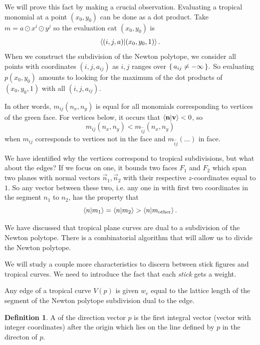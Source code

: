 \documentclass[12pt]{memoir}
\theoremstyle{definition}
\newtheorem{protodefinition}{Definition}[section]
\newenvironment{define}
   {\begin{protodefinition}}
   {\end{protodefinition}}
\begin{document}
We will prove this fact by making a crucial observation. Evaluating a tropical monomial at a point $(x_0,y_0)$ can be done as a dot product. Take $m=a\odot x^i\odot y^j$ so the evaluation cat $(x_0,y_0)$ is 
$$\braket{(i,j,a)}{(x_0,y_0,1)}.$$
When we construct the subdivision of the Newton polytope, we consider all points with coordinates $(i,j,a_{ij})$ as $i,j$ ranges over $\{\,a_{ij}\neq -\infty\,\}.$
So evaluating $p(x_0,y_0)$ amounts to looking for the maximum of the dot products of $(x_0,y_0,1)$ with all $(i,j,a_{ij})$.\par 
{}\par 
In other words, $m_{ij}(n_x,n_y)$ is equal for all monomials corresponding to vertices of the green face. For vertices below, it occurs that $\braket{\mathbf{n}}{\mathbf{v}}<0$, so 
$$m_{ij}(n_x,n_y)<m_{\tilde i\tilde j}(n_x,n_y)$$
when $m_{ij}$ corresponds to vertices not in the face and $m_{\tilde i\tilde j}(\dots)$ in face.\par 
We have identified why the vertices correspond to tropical subdivisions, but what about the edges? If we focus on one, it bounds two faces $F_1$ and $F_2$ which span two planes with normal vectors $\vec n_1,\vec n_2$ with their respective $z$-coordinates equal to $1$. So any vector between these two, i.e. any one in with first two coordinates in the segment $n_1$ to $n_2$, has the property that 
$$\braket{n}{m_1}=\braket{n}{m_2}>\braket{n}{m_{\text{other}}}.$$ %

We have discussed that tropical plane curves are dual to a subdivision of the Newton polytope. There is a combinatorial algorithm that will allow us to divide the Newton polytope.\par 
We will study a couple more characteristics to discern between stick figures and tropical curves. We need to introduce the fact that each \emph{stick} gets a weight.

\begin{Def}
    Any edge of a tropical curve $V(p)$ is given  $w_e$ equal to the lattice length of the segment of the Newton polytope subdivision dual to the edge.
\end{Def}

\begin{define}
    A  of the direction vector $p$ is the first integral vector (vector with integer coordinates) after the origin which lies on the line defined by $p$ in the directon of $p.$
\end{define}
\end{document}
